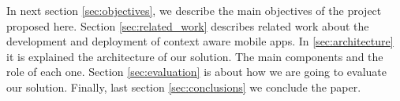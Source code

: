 In next section \ref{sec:objectives}, we describe the main
objectives of the project proposed here.
Section \ref{sec:related_work} describes related
work about the development and deployment of
context aware mobile apps.
In \ref{sec:architecture} it is explained the architecture of our solution. The main components and the role of
each one.
Section \ref{sec:evaluation} is about how we are going
to evaluate our solution.
Finally, last section \ref{sec:conclusions} we conclude
the paper.
